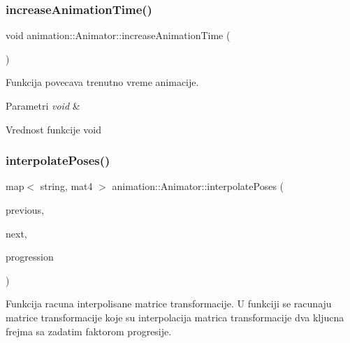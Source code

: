 \subsubsection{\texorpdfstring{increase\+Animation\+Time()}{increaseAnimationTime()}}
{\footnotesize\ttfamily void animation\+::\+Animator\+::increase\+Animation\+Time (\begin{DoxyParamCaption}{ }\end{DoxyParamCaption})\hspace{0.3cm}{\ttfamily [private]}}



Funkcija povecava trenutno vreme animacije. 


\begin{DoxyParams}{Parametri}
{\em void} & \\
\hline
\end{DoxyParams}
\begin{DoxyReturn}{Vrednost funkcije}
void 
\end{DoxyReturn}
\mbox{\label{classanimation_1_1Animator_a263a7e899c2df14b37d733f020412f54}} 
\subsubsection{\texorpdfstring{interpolate\+Poses()}{interpolatePoses()}}
{\footnotesize\ttfamily map$<$ string, mat4 $>$ animation\+::\+Animator\+::interpolate\+Poses (\begin{DoxyParamCaption}\item[{\hyperlink{classanimation_1_1KeyFrame}{Key\+Frame} $\ast$}]{previous,  }\item[{\hyperlink{classanimation_1_1KeyFrame}{Key\+Frame} $\ast$}]{next,  }\item[{float}]{progression }\end{DoxyParamCaption})\hspace{0.3cm}{\ttfamily [private]}}



Funkcija racuna interpolisane matrice transformacije. U funkciji se racunaju matrice transformacije koje su interpolacija matrica transformacije dva kljucna frejma sa zadatim faktorom progresije. 



